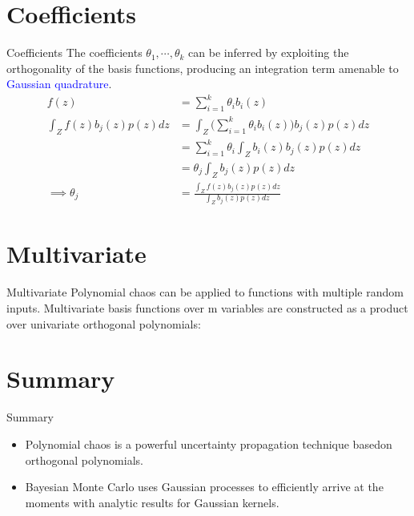 \documentclass{beamer}
\begin{document}
\section{Coefficients}
\begin{frame}{Coefficients}
The coefficients $\theta_1, \cdots, \theta_k$ can be inferred by exploiting the orthogonality of the basis functions, producing an integration term amenable to \textcolor{blue}{Gaussian quadrature}.
\begin{equation*}
\begin{split}
    f(z) &= \sum_{i=1}^k \theta_i b_i(z)\\
    \int_Z f(z)b_j(z)p(z)dz &= \int_Z \bigg(\sum_{i=1}^k \theta_i b_i(z) \bigg) b_j(z)p(z)dz\\
    &= \sum_{i=1}^k \theta_i \int_Z b_i(z)b_j(z)p(z)dz \\
    &= \theta_j \int_Z b_j(z)p(z)dz\\
    \implies \theta_j &= \frac{\int_Z f(z)b_j(z)p(z)dz}{\int_Z b_j(z)p(z)dz}
\end{split}
\end{equation*}
\end{frame}

\section{Multivariate}
\begin{frame}{Multivariate}
Polynomial chaos can be applied to functions with multiple random inputs. Multivariate basis functions over m variables are constructed as a product over univariate orthogonal polynomials:
\end{frame}

\section{Summary}
\begin{frame}{Summary}
    \begin{itemize}
        \item Polynomial chaos is a powerful uncertainty propagation technique basedon orthogonal polynomials.
        \item Bayesian Monte Carlo uses Gaussian processes to efficiently arrive at the moments with analytic results for Gaussian kernels.
    \end{itemize}
\end{frame}
\end{document}

